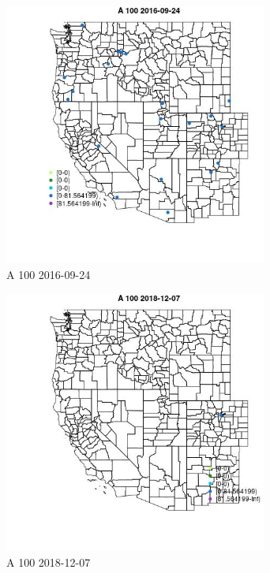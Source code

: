 \begin{figure} 
\centering  
\includegraphics[width=0.77\textwidth]{Code_Outputs/Report_ML_input_PM25_Step4_part_e_de_duplicated_aves_MapObsA_1002016-09-24.jpg} 
\caption{\label{fig:Report_ML_input_PM25_Step4_part_e_de_duplicated_avesMapObsA_1002016-09-24}A 100 2016-09-24} 
\end{figure} 
 

\clearpage 

\begin{figure} 
\centering  
\includegraphics[width=0.77\textwidth]{Code_Outputs/Report_ML_input_PM25_Step4_part_e_de_duplicated_aves_MapObsA_1002018-12-07.jpg} 
\caption{\label{fig:Report_ML_input_PM25_Step4_part_e_de_duplicated_avesMapObsA_1002018-12-07}A 100 2018-12-07} 
\end{figure} 
 

